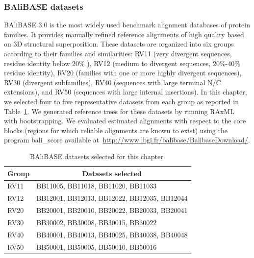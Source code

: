 \subsubsection{BAliBASE datasets}\label{subsec:balibase_stat}
BAliBASE 3.0 \citep{thompson2005balibase} is the most widely used benchmark alignment databases of protein families. It provides manually refined reference alignments of high quality based on 3D structural superposition. These datasets are organized into six groups according to their families and similarities: RV11 (very divergent sequences, residue identity below 20\% ), RV12 (medium to divergent sequences, 20\%-40\% residue identity), RV20 (families with one or more highly divergent sequences), RV30 (divergent subfamilies), RV40 (sequences with large terminal N/C extensions), and RV50 (sequences with large internal insertions). In this chapter, we selected four to five representative datasets from each group as reported in Table~\ref{tab:balibase}. We generated reference trees for these datasets by running RAxML~\citep{stamatakis2014raxml} with bootstrapping. We evaluated estimated alignments with respect to the core blocks (regions for which reliable alignments are known to exist) using the program bali\_score available at~\url{http://www.lbgi.fr/balibase/BalibaseDownload/}.

\begin{table}[htbp]
	\small
	\centering
	\caption{ BAliBASE datasets selected for this chapter.}
	\begin{tabular}{|l|l|}
		\hline
		\multicolumn{1}{|c|}{Group} & \multicolumn{1}{c|}{Datasets selected} \\
		\hline
		RV11  & BB11005, BB11018, BB11020, BB11033 \\
		\hline
		RV12  & BB12001, BB12013, BB12022, BB12035, BB12044 \\
		\hline
		RV20  & BB20001, BB20010, BB20022, BB20033, BB20041 \\
		\hline
		RV30  & BB30002, BB30008, BB30015, BB30022 \\
		\hline
		RV40  & BB40001, BB40013, BB40025, BB40038, BB40048 \\ %
		\hline
		RV50  & BB50001, BB50005, BB50010, BB50016 \\
		\hline
	\end{tabular}%
	\label{tab:balibase}%
\end{table}%

